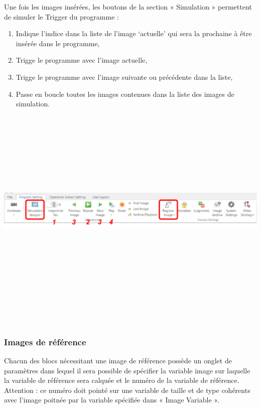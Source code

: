 \vspace{0.2cm}
Une fois les images insérées, les boutons de la section « Simulation » permettent de simuler le Trigger du programme :

\begin{enumerate}
  \item Indique l’indice dans la liste de l’image ‘actuelle’ qui sera la prochaine 
  à être insérée dans le programme,
  \item Trigge le programme avec l’image actuelle, 
  \item Trigge le programme avec l’image suivante ou précédente dans la liste,
  \item Passe en boucle toutes les images contenues dans la liste des images de simulation. 
\end{enumerate}
\vspace{0.3cm}

\noindent
\begin{minipage}[c]{\textwidth}
  \centering
  \includegraphics[width=16cm, height=10cm, keepaspectratio]{addOns/LaboCalib_SimulationTrigger.png}
  \label{fig.Image_SimulationTools}
\end{minipage}\\


\subsubsection{Images de référence}
\label{Sec.Images_ReferenceImages}
Chacun des blocs nécessitant une image de référence possède un onglet de paramètres dans lequel il sera possible de spécifier la variable image sur laquelle la variable de référence sera calquée et le numéro de la variable de référence. Attention : ce numéro doit pointé sur une variable de taille et de type cohérents avec l'image poitnée par la variable spécifiée dans « Image Variable ».\\


